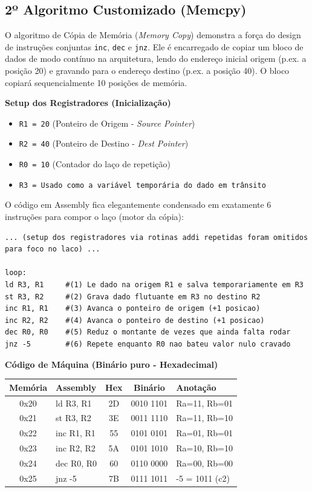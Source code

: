 \documentclass[11pt,a4paper]{article}
\begin{document}
\newpage

\subsection{2º Algoritmo Customizado (Memcpy)}
O algoritmo de Cópia de Memória (\textit{Memory Copy}) demonstra a força do design de instruções conjuntas \texttt{inc}, \texttt{dec} e \texttt{jnz}. Ele é encarregado de copiar um bloco de dados de modo contínuo na arquitetura, lendo do endereço inicial origem (p.ex. a posição 20) e gravando para o endereço destino (p.ex. a posição 40). O bloco copiará sequencialmente 10 posições de memória.

\textbf{Setup dos Registradores (Inicialização)}
\begin{itemize}
    \item \texttt{R1 = 20} (Ponteiro de Origem - \textit{Source Pointer})
    \item \texttt{R2 = 40} (Ponteiro de Destino - \textit{Dest Pointer})
    \item \texttt{R0 = 10} (Contador do laço de repetição)
    \item \texttt{R3 = Usado como a variável temporária do dado em trânsito} 
\end{itemize}

O código em Assembly fica elegantemente condensado em exatamente 6 instruções para compor o laço (motor da cópia):
\begin{lstlisting}
... (setup dos registradores via rotinas addi repetidas foram omitidos para foco no laco) ...

loop:
ld R3, R1     #(1) Le dado na origem R1 e salva temporariamente em R3
st R3, R2     #(2) Grava dado flutuante em R3 no destino R2
inc R1, R1    #(3) Avanca o ponteiro de origem (+1 posicao)
inc R2, R2    #(4) Avanca o ponteiro de destino (+1 posicao)
dec R0, R0    #(5) Reduz o montante de vezes que ainda falta rodar
jnz -5        #(6) Repete enquanto R0 nao bateu valor nulo cravado
\end{lstlisting}


\vspace{0.5cm}
\textbf{Código de Máquina (Binário puro - Hexadecimal)}
\begin{table}[H]
\centering
\begin{tabular}{clccl}
\toprule
\textbf{Memória} & \textbf{Assembly} & \textbf{Hex} & \textbf{Binário} & \textbf{Anotação} \\
\midrule
0x20 & ld R3, R1  & 2D & 0010 1101 & Ra=11, Rb=01 \\
0x21 & st R3, R2  & 3E & 0011 1110 & Ra=11, Rb=10 \\
0x22 & inc R1, R1 & 55 & 0101 0101 & Ra=01, Rb=01 \\
0x23 & inc R2, R2 & 5A & 0101 1010 & Ra=10, Rb=10 \\
0x24 & dec R0, R0 & 60 & 0110 0000 & Ra=00, Rb=00 \\
0x25 & jnz -5     & 7B & 0111 1011 & -5 = 1011 (c2) \\
\bottomrule
\end{tabular}
\end{table}
\vspace{0.2cm}
\end{document}

